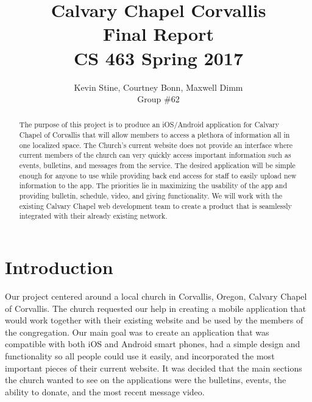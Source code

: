 \documentclass[letterpaper,10pt,draftclsnofoot,onecolumn,titlepage]{IEEEtran}
\def\name{Kevin Stine, Courtney Bonn, Maxwell Dimm}
\def\team{Calvary Chapel Corvallis}
\def\grp{Group \#62}
\begin{document}
	\title{\huge \team \\ Final Report\\ CS 463 Spring 2017}
	\author{\large \name \\ \grp}



	\maketitle

		\begin{abstract}The purpose of this project is to produce an \gls{iOS}/\gls{Android} application for Calvary Chapel of Corvallis that will allow members to access a plethora of information all in one localized space.
		The Church's current website does not provide an interface where current members of the church can very quickly access important information such as events, bulletins, and messages from the service.
		The desired application will be simple enough for anyone to use while providing back end access for staff to easily upload new information to the app.
		The priorities lie in maximizing the usability of the app and providing bulletin, schedule, video, and giving functionality.
		We will work with the existing Calvary Chapel web development team to create a product that is seamlessly integrated with their already existing network.
		\end{abstract}

		\clearpage

		\tableofcontents

		\clearpage

\section{Introduction}

Our project centered around a local church in Corvallis, Oregon, Calvary Chapel of Corvallis.
The church requested our help in creating a mobile application that would work together with their existing website and be used by the members of the congregation.
Our main goal was to create an application that was compatible with both iOS and Android smart phones, had a simple design and functionality so all people could use it easily, and incorporated the most important pieces of their current website.
It was decided that the main sections the church wanted to see on the applications were the bulletins, events, the ability to donate, and the most recent message video.
\end{document}
